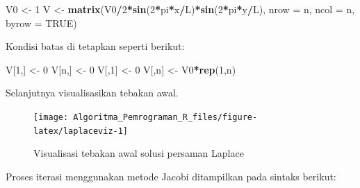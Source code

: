 \documentclass[
]{book}
\newenvironment{Shaded}{\begin{snugshade}}{\end{snugshade}}
\newcommand{\AttributeTok}[1]{\textcolor[rgb]{0.13,0.29,0.53}{#1}}
\newcommand{\ConstantTok}[1]{\textcolor[rgb]{0.56,0.35,0.01}{#1}}
\newcommand{\DecValTok}[1]{\textcolor[rgb]{0.00,0.00,0.81}{#1}}
\newcommand{\FunctionTok}[1]{\textcolor[rgb]{0.13,0.29,0.53}{\textbf{#1}}}
\newcommand{\NormalTok}[1]{#1}
\newcommand{\OtherTok}[1]{\textcolor[rgb]{0.56,0.35,0.01}{#1}}
\newcommand{\SpecialCharTok}[1]{\textcolor[rgb]{0.81,0.36,0.00}{\textbf{#1}}}
\theoremstyle{definition}
\theoremstyle{definition}
\theoremstyle{definition}
\theoremstyle{definition}
\theoremstyle{remark}
\begin{document}
\begin{Shaded}
\begin{Highlighting}[]
\NormalTok{V0  }\OtherTok{\textless{}{-}} \DecValTok{1}
\NormalTok{V   }\OtherTok{\textless{}{-}} \FunctionTok{matrix}\NormalTok{(V0}\SpecialCharTok{/}\DecValTok{2}\SpecialCharTok{*}\FunctionTok{sin}\NormalTok{(}\DecValTok{2}\SpecialCharTok{*}\NormalTok{pi}\SpecialCharTok{*}\NormalTok{x}\SpecialCharTok{/}\NormalTok{L)}\SpecialCharTok{*}\FunctionTok{sin}\NormalTok{(}\DecValTok{2}\SpecialCharTok{*}\NormalTok{pi}\SpecialCharTok{*}\NormalTok{y}\SpecialCharTok{/}\NormalTok{L),}
              \AttributeTok{nrow =}\NormalTok{ n, }\AttributeTok{ncol =}\NormalTok{ n, }\AttributeTok{byrow =} \ConstantTok{TRUE}\NormalTok{)}
\end{Highlighting}
\end{Shaded}

Kondisi batas di tetapkan seperti berikut:

\begin{Shaded}
\begin{Highlighting}[]
\NormalTok{V[}\DecValTok{1}\NormalTok{,] }\OtherTok{\textless{}{-}} \DecValTok{0}
\NormalTok{V[n,] }\OtherTok{\textless{}{-}} \DecValTok{0}
\NormalTok{V[,}\DecValTok{1}\NormalTok{] }\OtherTok{\textless{}{-}} \DecValTok{0}
\NormalTok{V[,n] }\OtherTok{\textless{}{-}}\NormalTok{ V0}\SpecialCharTok{*}\FunctionTok{rep}\NormalTok{(}\DecValTok{1}\NormalTok{,n)}
\end{Highlighting}
\end{Shaded}

Selanjutnya visualisasikan tebakan awal.

\begin{figure}

{\centering \texttt{[image: Algoritma\_Pemrograman\_R\_files/figure-latex/laplaceviz-1]} 

}

\caption{Visualisasi tebakan awal solusi persaman Laplace}\label{fig:laplaceviz}
\end{figure}

Proses iterasi menggunakan metode Jacobi ditampilkan pada sintaks berikut:
\end{document}
